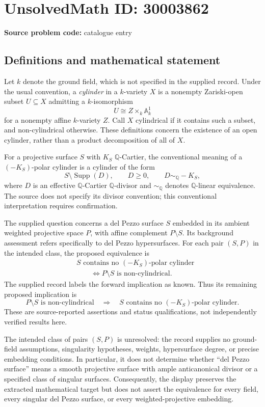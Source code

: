 \documentclass[11pt]{article}
\newcommand{\Q}{\mathbb{Q}}
\newcommand{\A}{\mathbb{A}}
\begin{document}
\section*{UnsolvedMath ID: 30003862}
\textbf{Source problem code:} catalogue entry
\subsection{Definitions and mathematical statement}
Let \(k\) denote the ground field, which is not specified in the supplied record. Under the usual convention, a \emph{cylinder} in a \(k\)-variety \(X\) is a nonempty Zariski-open subset \(U\subseteq X\) admitting a \(k\)-isomorphism
\[
U\cong Z\times_k\A^1_k
\]
for a nonempty affine \(k\)-variety \(Z\). Call \(X\) cylindrical if it contains such a subset, and non-cylindrical otherwise. These definitions concern the existence of an open cylinder, rather than a product decomposition of all of \(X\).

For a projective surface \(S\) with \(K_S\) \(\Q\)-Cartier, the conventional meaning of a \((-K_S)\)-polar cylinder is a cylinder of the form
\[
S\setminus\operatorname{Supp}(D),
\qquad D\geq 0,\qquad D\sim_{\Q}-K_S,
\]
where \(D\) is an effective \(\Q\)-Cartier \(\Q\)-divisor and \(\sim_{\Q}\) denotes \(\Q\)-linear equivalence. The source does not specify its divisor convention; this conventional interpretation requires confirmation.

The supplied question concerns a del Pezzo surface \(S\) embedded in its ambient weighted projective space \(P\), with affine complement \(P\setminus S\). Its background assessment refers specifically to del Pezzo hypersurfaces. For each pair \((S,P)\) in the intended class, the proposed equivalence is
\[
\begin{aligned}
&S\text{ contains no }(-K_S)\text{-polar cylinder}\\
&\hspace{2em}\Longleftrightarrow
P\setminus S\text{ is non-cylindrical}.
\end{aligned}
\]
The supplied record labels the forward implication as known. Thus its remaining proposed implication is
\[
P\setminus S\text{ is non-cylindrical}
\quad\Longrightarrow\quad
S\text{ contains no }(-K_S)\text{-polar cylinder}.
\]
These are source-reported assertions and status qualifications, not independently verified results here.

The intended class of pairs \((S,P)\) is unresolved: the record supplies no ground-field assumptions, singularity hypotheses, weights, hypersurface degree, or precise embedding conditions. In particular, it does not determine whether ``del Pezzo surface'' means a smooth projective surface with ample anticanonical divisor or a specified class of singular surfaces. Consequently, the display preserves the extracted mathematical target but does not assert the equivalence for every field, every singular del Pezzo surface, or every weighted-projective embedding.
\end{document}
